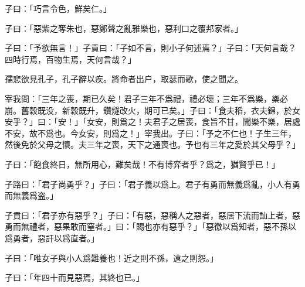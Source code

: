 子曰：「巧言令色，鮮矣仁。」

子曰：「惡紫之奪朱也，惡鄭聲之亂雅樂也，惡利口之覆邦家者。」

子曰：「予欲無言！」子貢曰：「子如不言，則小子何述焉？」子曰：「天何言哉？四時行焉，百物生焉，天何言哉？」

孺悲欲見孔子，孔子辭以疾。將命者出户，取瑟而歌，使之聞之。

宰我問：「三年之喪，期已久矣！君子三年不爲禮，禮必壞；三年不爲樂，樂必崩。舊穀既没，新穀既升，鑽燧改火，期可已矣。」子曰：「食夫稻，衣夫錦，於女安乎？」曰：「安！」「女安，則爲之！夫君子之居喪，食旨不甘，聞樂不樂，居處不安，故不爲也。今女安，則爲之！」宰我出。子曰：「予之不仁也！子生三年，然後免於父母之懷。夫三年之喪，天下之通喪也。予也有三年之愛於其父母乎？」

子曰：「飽食終日，無所用心，難矣哉！不有博弈者乎？爲之，猶賢乎已！」

子路曰：「君子尚勇乎？」子曰：「君子義以爲上。君子有勇而無義爲亂，小人有勇而無義爲盗。」

子貢曰：「君子亦有惡乎？」子曰：「有惡，惡稱人之惡者，惡居下流而訕上者，惡勇而無禮者，惡果敢而窒者。」曰：「賜也亦有惡乎？」「惡徼以爲知者，惡不孫以爲勇者，惡訐以爲直者。」

子曰：「唯女子與小人爲難養也！近之則不孫，遠之則怨。」

子曰：「年四十而見惡焉，其終也已。」
